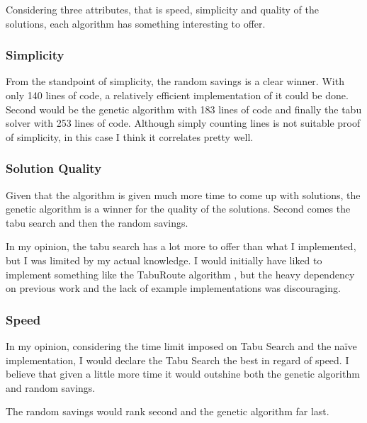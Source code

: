 \documentclass{article} %
\begin{document}
Considering three attributes, that is speed, simplicity and quality of the solutions, each algorithm has something interesting to offer.\newline

\subsubsection{Simplicity}

From the standpoint of simplicity, the random savings is a clear winner. With only 140 lines of code, a relatively efficient implementation of it could be done. Second would be the genetic algorithm with 183 lines of code and finally the tabu solver with 253 lines of code. Although simply counting lines is not suitable proof of simplicity, in this case I think it correlates pretty well.\newline


\subsubsection{Solution Quality}

Given that the algorithm is given much more time to come up with solutions, the genetic algorithm is a winner for the quality of the solutions. Second comes the tabu search and then the random savings.\newline

In my opinion, the tabu search has a lot more to offer than what I implemented, but I was limited by my actual knowledge. I would initially have liked to implement something like the TabuRoute algorithm \citep{taburoute}, but the heavy dependency on previous work and the lack of example implementations was discouraging.\newline


\subsubsection{Speed}

In my opinion, considering the time limit imposed on Tabu Search and the naïve implementation, I would declare the Tabu Search the best in regard of speed. I believe that given a little more time it would outshine both the genetic algorithm and random savings.\newline

The random savings would rank second and the genetic algorithm far last.


\end{document}
